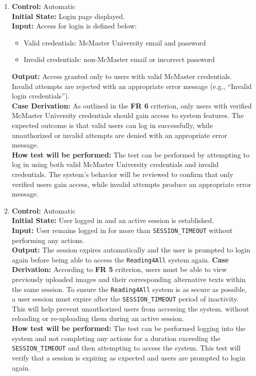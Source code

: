 \documentclass[12pt, titlepage]{article}
\begin{document}
\begin{enumerate}[label=FR-ST \arabic*., wide=0pt, leftmargin=*]
  \item{}
    {\bf Control:} Automatic\\
    {\bf Initial State:} Login page displayed.\\
    {\bf Input:} Access for login is defined below:
    \begin{itemize}
      \item Valid credentials: McMaster University email and password
      \item Invalid credentials: non-McMaster email or incorrect password
    \end{itemize}
    {\bf Output:} Access granted only to users with valid McMaster
    credentials. Invalid attempts are rejected with an appropriate
    error message (e.g., “Invalid login credentials”).\\
    {\bf  Case Derivation:} As outlined in the \textbf{FR 6}
    criterion, only users with verified McMaster University
    credentials should gain access to system features. The expected
    outcome is that valid users can log in successfully, while
    unauthorized or invalid attempts are denied with an appropriate
    error message.\\
    {\bf How test will be performed:} The test can be performed by
    attempting to log in using both valid McMaster University
    credentials and invalid credentials. The system’s behavior will
    be reviewed to confirm that only verified users gain access,
    while invalid attempts produce an appropriate error message.\\

  \item{}
    {\bf Control:} Automatic\\
    {\bf Initial State:} User logged in and an active session is established.\\
    {\bf Input:} User remains logged in for more than \texttt{SESSION\_TIMEOUT} without performing any actions.  \\
    {\bf Output:} The session expires automatically and the user is prompted to login again before being able to access the \texttt{Reading4All} system again. 
    {\bf  Case Derivation:} According to \textbf{FR 5} criterion, users must be 
    able to view previously uploaded images and their corresponding alternative texts within the same session. 
    To ensure the \texttt{Reading4All} system is as secure as possible, a user session must expire after the  \texttt{SESSION\_TIMEOUT} period of inactivity. This will help prevent unauthorized users from accessing the system. 
    without reloading or re-uploading them during an active session.\\
    {\bf How test will be performed:} The test can be performed logging into the system and not completing any actions for a duration exceeding the \texttt{SESSION\_TIMEOUT} and then attempting to access the system. This test will 
    verify that a session is expiring as expected and users are prompted to login again. \\
\end{enumerate}
\end{document}
